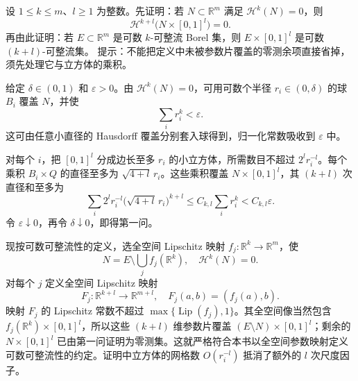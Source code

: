 \begin{exercise}\label{b1:ex:19-rectifiable-cylinder}
设 \(1\le k\le m\)、\(l\ge1\) 为整数。先证明：若 \(N\subset\mathbb R^m\) 满足 \(\mathcal H^k(N)=0\)，则
\[
 \mathcal H^{k+l}\bigl(N\times[0,1]^l\bigr)=0.
\]
再由此证明：若 \(E\subset\mathbb R^m\) 是可数 \(k\)-可整流 Borel 集，则 \(E\times[0,1]^l\) 是可数 \((k+l)\)-可整流集。
提示：不能把定义中未被参数片覆盖的零测余项直接省掉，须先处理它与立方体的乘积。
\end{exercise}
\begin{solution}
给定 \(\delta\in(0,1)\) 和 \(\varepsilon>0\)。由 \(\mathcal H^k(N)=0\)，可用可数个半径 \(r_i\in(0,\delta)\) 的球 \(B_i\) 覆盖 \(N\)，并使
\[
 \sum_i r_i^k<\varepsilon.
\]
这可由任意小直径的 Hausdorff 覆盖分别套入球得到，归一化常数吸收到 \(\varepsilon\) 中。

对每个 \(i\)，把 \([0,1]^l\) 分成边长至多 \(r_i\) 的小立方体，所需数目不超过 \(2^lr_i^{-l}\)。每个乘积 \(B_i\times Q\) 的直径至多为 \(\sqrt{4+l}\,r_i\)。这些乘积覆盖 \(N\times[0,1]^l\)，其 \((k+l)\) 次直径和至多为
\[
 \sum_i2^lr_i^{-l}
 \bigl(\sqrt{4+l}\,r_i\bigr)^{k+l}
 \le C_{k,l}\sum_i r_i^k
 <C_{k,l}\varepsilon.
\]
令 \(\varepsilon\downarrow0\)，再令 \(\delta\downarrow0\)，即得第一问。

现按可数可整流性的定义，选全空间 Lipschitz 映射 \(f_j:\mathbb R^k\rightarrow\mathbb R^m\)，使
\[
 N=E\setminus\bigcup_jf_j(\mathbb R^k),
 \quad \mathcal H^k(N)=0.
\]
对每个 \(j\) 定义全空间 Lipschitz 映射
\[
 F_j:\mathbb R^{k+l}\longrightarrow\mathbb R^{m+l},
 \quad F_j(a,b)=(f_j(a),b).
\]
映射 \(F_j\) 的 Lipschitz 常数不超过 \(\max\{\operatorname{Lip}(f_j),1\}\)。其全空间像当然包含 \(f_j(\mathbb R^k)\times[0,1]^l\)，所以这些 \((k+l)\) 维参数片覆盖 \((E\setminus N)\times[0,1]^l\)；剩余的 \(N\times[0,1]^l\) 已由第一问证明为零测集。这就严格符合本书以全空间参数映射定义可数可整流性的约定。证明中立方体的网格数 \(O(r_i^{-l})\) 抵消了额外的 \(l\) 次尺度因子。
\end{solution}

